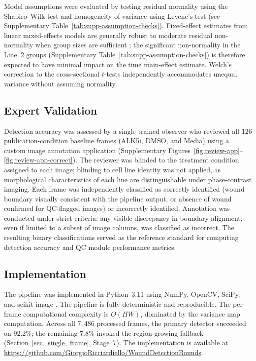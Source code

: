 Model assumptions were evaluated by testing residual normality using the Shapiro--Wilk test and homogeneity of variance using Levene's test (see Supplementary Table~\ref{tab:supp-assumption-checks}).
Fixed-effect estimates from linear mixed-effects models are generally robust to moderate residual non-normality when group sizes are sufficient \citep{Schielzeth2020}; the significant non-normality in the Line~2 groups (Supplementary Table~\ref{tab:supp-assumption-checks}) is therefore expected to have minimal impact on the time main-effect estimate. Welch's correction to the cross-sectional $t$-tests independently accommodates unequal variance without assuming normality.

\subsection{Expert Validation}

Detection accuracy was assessed by a single trained observer who reviewed all 126 publication-condition baseline frames (ALK5i, DMSO, and Media) using a custom image annotation application (Supplementary Figures~\ref{fig:review-app}--\ref{fig:review-app-correct}). The reviewer was blinded to the treatment condition assigned to each image; blinding to cell line identity was not applied, as morphological characteristics of each line are distinguishable under phase-contrast imaging. Each frame was independently classified as correctly identified (wound boundary visually consistent with the pipeline output, or absence of wound confirmed for QC-flagged images) or incorrectly identified. Annotation was conducted under strict criteria: any visible discrepancy in boundary alignment, even if limited to a subset of image columns, was classified as incorrect. The resulting binary classifications served as the reference standard for computing detection accuracy and QC module performance metrics.

\subsection{Implementation}
The pipeline was implemented in Python~3.11 using NumPy, OpenCV, SciPy, and scikit-image \citep{vanderWalt2014}. The pipeline is fully deterministic and reproducible. The per-frame computational complexity is $O(HW)$, dominated by the variance map computation. Across all $7{,}486$ processed frames, the primary detector succeeded on $92.2\%$; the remaining $7.8\%$ invoked the region-growing fallback (Section~\ref{sec_single_frame}, Stage~7). The implementation is available at \url{https://github.com/GiorgioRicciardiello/WoundDetectionBounds}.
